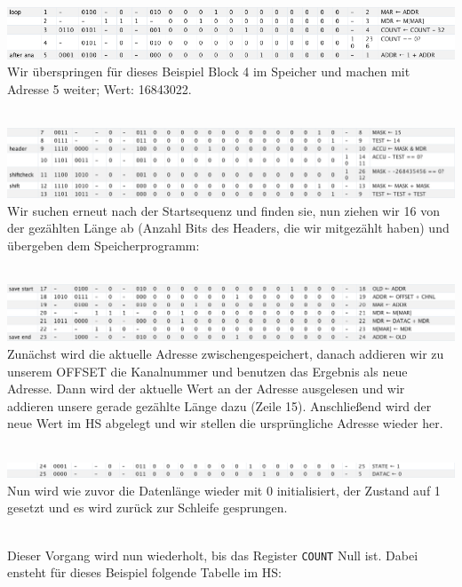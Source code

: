 \documentclass[12pt,titlepage]{article}
\begin{document}
\leavevmode \\
\includegraphics[width=16cm]{listing/row1-5.png}
\leavevmode \\
Wir überspringen für dieses Beispiel Block 4 im Speicher und machen mit Adresse 5 weiter; Wert: 16843022.

\leavevmode \\
\includegraphics[width=16cm]{listing/row7-13.png}
\leavevmode \\
Wir suchen erneut nach der Startsequenz und finden sie, nun ziehen wir 16 von der gezählten Länge ab (Anzahl Bits des Headers, die wir
mitgezählt haben) und übergeben dem Speicherprogramm:

\leavevmode \\
\includegraphics[width=16cm]{listing/row17-23.png}
\leavevmode \\
Zunächst wird die aktuelle Adresse zwischengespeichert, danach addieren wir zu unserem OFFSET die Kanalnummer und benutzen das Ergebnis
als neue Adresse. Dann wird der aktuelle Wert an der Adresse ausgelesen und wir addieren unsere gerade gezählte Länge dazu (Zeile 15).
Anschließend wird der neue Wert im HS abgelegt und wir stellen die ursprüngliche Adresse wieder her.

\leavevmode \\
\includegraphics[width=16cm]{listing/row24-25.png}
\leavevmode \\
Nun wird wie zuvor die Datenlänge wieder mit 0 initialisiert, der Zustand auf 1 gesetzt und es wird zurück zur Schleife gesprungen.

\leavevmode \\
Dieser Vorgang wird nun wiederholt, bis das Register \texttt{COUNT} Null ist. Dabei ensteht für dieses Beispiel folgende Tabelle im HS:
\end{document}
